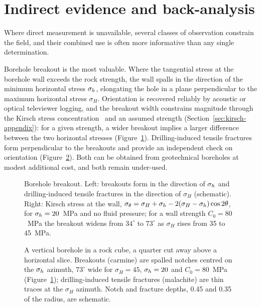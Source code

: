 \section{Indirect evidence and back-analysis}
\label{sec:indirect-evidence}

Where direct measurement is unavailable, several classes of observation
constrain the field, and their combined use is often more informative than any
single determination.

Borehole breakout is the most valuable. Where the tangential stress at the
borehole wall exceeds the rock strength, the wall spalls in the direction of
the minimum horizontal stress $\sigma_h$, elongating the hole in a plane perpendicular to
the maximum horizontal stress $\sigma_H$. Orientation is recovered reliably by acoustic
or optical televiewer logging, and the breakout width constrains magnitude
through the Kirsch stress concentration~\citep{kirsch1898} and an assumed
strength (Section~\ref{sec:kirsch-appendix}): for a given strength, a wider
breakout implies a larger difference between the two horizontal stresses
(Figure~\ref{fig:borehole-breakout}).
Drilling-induced tensile fractures form perpendicular to the breakouts and
provide an independent check on orientation
(Figure~\ref{fig:r3d-breakout-block}). Both can be obtained from
geotechnical boreholes at modest additional cost, and both remain
under-used.

\begin{figure}[htbp]
\centering
{}
\caption{Borehole breakout. Left: breakouts form in the direction of $\sigma_h$ and drilling-induced tensile fractures in the direction of $\sigma_H$ (schematic). Right: Kirsch stress at the wall, $\sigma_\theta = \sigma_H + \sigma_h - 2(\sigma_H - \sigma_h)\cos 2\theta$, for $\sigma_h = 20$~MPa and no fluid pressure; for a wall strength $C_0 = 80$~MPa the breakout widens from $34^\circ$ to $73^\circ$ as $\sigma_H$ rises from 35 to 45~MPa.}
\label{fig:borehole-breakout}
\end{figure}

\begin{figure}[htbp]
\centering
{}
\caption{A vertical borehole in a rock cube, a quarter cut away above a
horizontal slice. Breakouts (carmine) are spalled notches centred on the $\sigma_h$
azimuth, $73^\circ$ wide for $\sigma_H = 45$, $\sigma_h = 20$ and $C_0 = 80$~MPa
(Figure~\ref{fig:borehole-breakout}); drilling-induced tensile fractures
(malachite) are thin traces at the $\sigma_H$ azimuth. Notch and fracture
depths, 0.45 and 0.35 of the radius, are schematic.}
\label{fig:r3d-breakout-block}
\end{figure}

